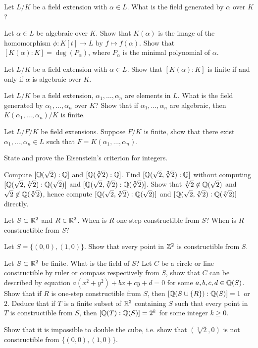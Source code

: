 \begin{question}{4}
    Let $L/K$ be a field extension with $\alpha \in L$. What is the field generated by $\alpha$ over $K$?

    Let $\alpha \in L$ be algebraic over $K$. Show that $K(\alpha)$ is the image of the homomorphism $\phi:K[t] \rightarrow L$ by $f \mapsto f(\alpha)$. Show that $[K(\alpha):K] = \deg(P_\alpha)$, where $P_\alpha$ is the minimal polynomial of $\alpha$. 

    Let $L/K$ be a field extension with $\alpha \in L$. Show that $[K(\alpha):K]$ is finite if and only if $\alpha$ is algebraic over $K$.
\end{question}

\begin{question}{5}
    Let $L/K$ be a field extension, $\alpha_1, \dots, \alpha_n$ are elements in $L$. What is the field generated by $\alpha_1,\dots,\alpha_n$ over $K$? Show that if $\alpha_1,\dots,\alpha_n$ are algebraic, then $K(\alpha_1,\dots,\alpha_n)/K$ is finite.

    Let $L/F/K$ be field extensions. Suppose $F/K$ is finite, show that there exist $\alpha_1, \dots, \alpha_n \in L$ such that $F = K(\alpha_1,\dots,\alpha_n)$.
\end{question}

\begin{question}{6}
    State and prove the Eisenstein's criterion for integers.

    Compute $[\mathbb{Q}(\sqrt{2}): \mathbb{Q}]$ and $[\mathbb{Q}(\sqrt[3]{2}): \mathbb{Q}]$. Find $[\mathbb{Q}(\sqrt{2},\sqrt[3]{2}) : \mathbb{Q}]$ without computing $[\mathbb{Q}(\sqrt{2},\sqrt[3]{2}) : \mathbb{Q}(\sqrt{2})]$ and $[\mathbb{Q}(\sqrt{2},\sqrt[3]{2}) : \mathbb{Q}(\sqrt[3]{2})]$. Show that $\sqrt[3]{2} \not \in \mathbb{Q}(\sqrt{2})$ and $\sqrt{2} \not \in \mathbb{Q}(\sqrt[3]{2})$, hence compute $[\mathbb{Q}(\sqrt{2},\sqrt[3]{2}) : \mathbb{Q}(\sqrt{2})]$ and $[\mathbb{Q}(\sqrt{2},\sqrt[3]{2}) : \mathbb{Q}(\sqrt[3]{2})]$ directly.
\end{question}

\begin{question}{7}
    Let $S \subset \mathbb{R}^2$ and $R \in \mathbb{R}^2$. When is $R$ one-step constructible from $S$? When is $R$ constructible from $S$? 

    Let $S = \{(0,0),(1,0)\}$. Show that every point in $\mathbb{Z}^2$ is constructible from $S$.

    Let $S \subset \mathbb{R}^2$ be finite. What is the field of $S$? Let $C$ be a circle or line constructible by ruler or compass respectively from $S$, show that $C$ can be described by equation $a(x^2 + y^2) + bx + cy + d = 0$ for some $a,b,c,d \in \mathbb{Q}(S)$. Show that if $R$ is one-step constructible from $S$, then $[\mathbb{Q}(S \cup \{R\}) : \mathbb{Q}(S)] = 1$ or $2$. Deduce that if $T$ is a finite subset of $\mathbb{R}^2$ containing $S$ such that every point in $T$ is constructible from $S$, then $[\mathbb{Q}(T) : \mathbb{Q}(S)] = 2^k$ for some integer $k \geq 0$. 

    Show that it is impossible to double the cube, i.e. show that $(\sqrt[3]{2}, 0)$ is not constructible from $\{(0,0),(1,0)\}$.
\end{question}

